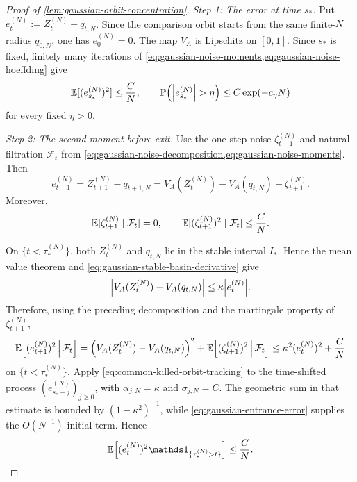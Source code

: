 \documentclass[11pt,reqno,a4paper]{article}
\newcommand{\Pp}{\P}
\newcommand{\Ee}{\E}
\begin{document}
\begin{proof}[Proof of \cref{lem:gaussian-orbit-concentration}]
  \emph{Step 1: The error at time $s_\ast$.}
  Put
  $
    e_t^{(N)}:=Z_t^{(N)}-q_{t,N}
  $.
  Since the comparison orbit starts from the same finite-$N$ radius
  $q_{0,N}$, one has $e_0^{(N)}=0$. The map $V_A$ is Lipschitz on
  $[0,1]$. Since $s_\ast$ is fixed, finitely many iterations of
  \cref{eq:gaussian-noise-moments,eq:gaussian-noise-hoeffding} give
  \begin{equation}\label{eq:gaussian-entrance-error}
    \Ee[(e_{s_\ast}^{(N)})^2]\leq \frac{C}{N},
    \qquad
    \Pp\left(\abs{e_{s_\ast}^{(N)}}>\eta\right)
    \leq
    C\exp(-c_\eta N)
  \end{equation}
  for every fixed $\eta>0$.

  \emph{Step 2: The second moment before exit.}
  Use the one-step noise $\zeta_{t+1}^{(N)}$ and natural filtration
  $\mathcal F_t$ from
  \cref{eq:gaussian-noise-decomposition,eq:gaussian-noise-moments}. Then
  \begin{equation*}
    e_{t+1}^{(N)}
    =
    Z_{t+1}^{(N)}-q_{t+1,N}
    =
    V_A(Z_t^{(N)})-V_A(q_{t,N})
    +
    \zeta_{t+1}^{(N)}.
  \end{equation*}
  Moreover,
  \begin{equation*}
    \Ee[\zeta_{t+1}^{(N)}\mid \mathcal F_t]=0,
    \qquad
    \Ee[(\zeta_{t+1}^{(N)})^2\mid \mathcal F_t]\leq \frac{C}{N}.
  \end{equation*}

  On $\{t<\tau_\ast^{(N)}\}$, both $Z_t^{(N)}$ and $q_{t,N}$ lie in the
  stable interval $I_\ast$. Hence the mean value theorem and
  \cref{eq:gaussian-stable-basin-derivative} give
  \begin{equation*}
    \abs{V_A(Z_t^{(N)})-V_A(q_{t,N})}
    \leq
    \kappa\abs{e_t^{(N)}}.
  \end{equation*}
  Therefore, using the preceding decomposition and the martingale property of
  $\zeta_{t+1}^{(N)}$,
  \begin{equation*}
    \Ee\left[
      (e_{t+1}^{(N)})^2
      \,\middle|\,\mathcal F_t
    \right]
    =
    \left(
      V_A(Z_t^{(N)})-V_A(q_{t,N})
    \right)^2
    +
    \Ee\left[
      (\zeta_{t+1}^{(N)})^2
      \,\middle|\,\mathcal F_t
    \right]
    \leq
    \kappa^2(e_t^{(N)})^2+\frac{C}{N}
  \end{equation*}
  on $\{t<\tau_\ast^{(N)}\}$. Apply
  \cref{eq:common-killed-orbit-tracking} to the time-shifted process
  $(e_{s_\ast+j}^{(N)})_{j\geq0}$, with
  $\alpha_{j,N}=\kappa$ and $\sigma_{j,N}=C$. The geometric sum in that
  estimate is bounded by $(1-\kappa^2)^{-1}$, while
  \cref{eq:gaussian-entrance-error} supplies the $O(N^{-1})$ initial term.
  Hence
  \begin{equation}\label{eq:gaussian-stopped-orbit-concentration}
    \Ee\left[
      (e_t^{(N)})^2
      \one_{\{\tau_\ast^{(N)}>t\}}
    \right]
    \leq
    \frac{C}{N}.
  \end{equation}


\end{proof}
\end{document}

